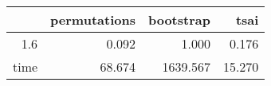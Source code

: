 \begin{table}[ht]
\centering
\begingroup\tiny
\begin{tabular}{rrrr}
  \hline
 & permutations & bootstrap & tsai \\ 
  \hline
1.6 & 0.092 & 1.000 & 0.176 \\ 
  time & 68.674 & 1639.567 & 15.270 \\ 
   \hline
\end{tabular}
\endgroup
\end{table}
